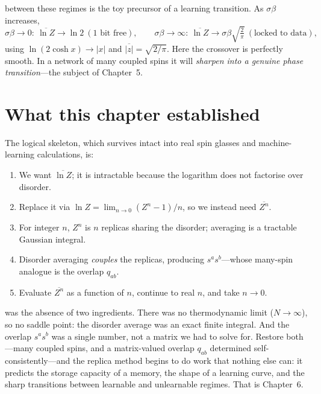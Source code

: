 \documentclass[nobib,justified]{tufte-handout}
\newcommand{\dbar}[1]{\overline{#1}}            %
\begin{document}
 between these regimes is the toy precursor of a
learning transition. As $\sigma\beta$ increases,
\[
  \sigma\beta\to0:\ \dbar{\ln Z}\to\ln 2 \ (\text{1 bit free}),
  \qquad
  \sigma\beta\to\infty:\ \dbar{\ln Z}\to \sigma\beta\sqrt{\tfrac{2}{\pi}}
  \ (\text{locked to data}),
\]
using $\ln(2\cosh x)\to|x|$ and $\dbar{|z|}=\sqrt{2/\pi}$. Here the
crossover is perfectly smooth. In a network of many coupled spins it will
\emph{sharpen into a genuine phase transition}---the subject of
Chapter~5.

\section{What this chapter established}

The logical skeleton, which survives intact into real spin glasses and
machine-learning calculations, is:
\begin{enumerate}
\item We want $\dbar{\ln Z}$; it is intractable because the logarithm does
  not factorise over disorder.
\item Replace it via $\ln Z=\lim_{n\to0}(Z^n-1)/n$, so we instead need
  $\dbar{Z^n}$.
\item For integer $n$, $Z^n$ is $n$ replicas sharing the disorder;
  averaging is a tractable Gaussian integral.
\item Disorder averaging \emph{couples} the replicas, producing
  $s^a s^b$---whose many-spin analogue is the overlap $q_{ab}$.
\item Evaluate $\dbar{Z^n}$ as a function of $n$, continue to real $n$,
  and take $n\to 0$.
\end{enumerate}

 was the absence of two ingredients.
There was no thermodynamic limit ($N\to\infty$), so no saddle point: the
disorder average was an exact finite integral. And the overlap $s^a s^b$
was a single number, not a matrix we had to solve for. Restore both---many
coupled spins, and a matrix-valued overlap $q_{ab}$ determined
self-consistently---and the replica method begins to do work that nothing
else can: it predicts the storage capacity of a memory, the shape of a
learning curve, and the sharp transitions between learnable and
unlearnable regimes. That is Chapter~6.
\end{document}
